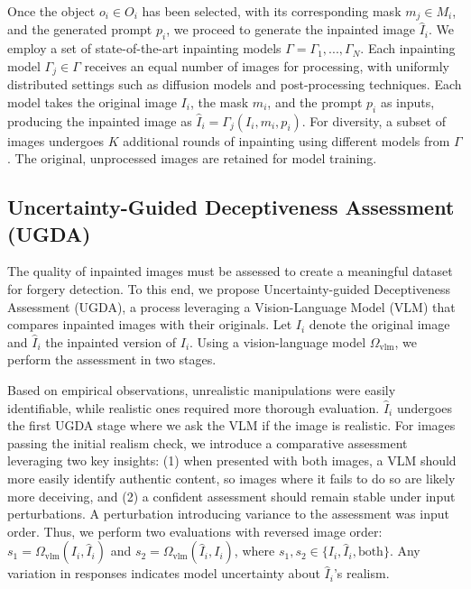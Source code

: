 Once the object $o_i \in O_i$ has been selected, with its corresponding mask $m_j \in M_i$, and the generated prompt $p_i$, we proceed to generate the inpainted image $\hat{I}_i$. We employ a set of state-of-the-art inpainting models $\Gamma = {\Gamma_1, ..., \Gamma_N}$. Each inpainting model $\Gamma_j \in \Gamma$ receives an equal number of images for processing, with uniformly distributed settings such as diffusion models and post-processing techniques. Each model takes the original image $I_i$, the mask $m_i$, and the prompt $p_i$ as inputs, producing the inpainted image as $\hat{I}_i = \Gamma_j(I_i, m_i, p_i)$. For diversity, a subset of images undergoes $K$ additional rounds of inpainting using different models from $\Gamma$. The original, unprocessed images are retained for model training.



\subsection{Uncertainty-Guided Deceptiveness Assessment (UGDA)}
\label{sec:ugda}

The quality of inpainted images must be assessed to create a meaningful dataset for forgery detection. To this end, we propose Uncertainty-guided Deceptiveness Assessment (UGDA), a process leveraging a Vision-Language Model (VLM) that compares inpainted images with their originals. Let $I_i$ denote the original image and $\hat{I}_i$ the inpainted version of $I_i$. Using a vision-language model $\Omega_\text{vlm}$, we perform the assessment in two stages.

Based on empirical observations, unrealistic manipulations were easily identifiable, while realistic ones required more thorough evaluation. $\hat{I}_i$ undergoes the first UGDA stage where we ask the VLM if the image is realistic. For images passing the initial realism check, we introduce a comparative assessment leveraging two key insights: (1) when presented with both images, a VLM should more easily identify authentic content, so images where it fails to do so are likely more deceiving, and (2) a confident assessment should remain stable under input perturbations. A perturbation introducing variance to the assessment was input order. Thus, we perform two evaluations with reversed image order: $s_1 = \Omega_\text{vlm}(I_i, \hat{I}_i)$ and $s_2 = \Omega_\text{vlm}(\hat{I}_i, I_i)$, where $s_1, s_2 \in \{I_i, \hat{I}_i, \text{both}\}$. Any variation in responses indicates model uncertainty about $\hat{I}_i$'s realism.

